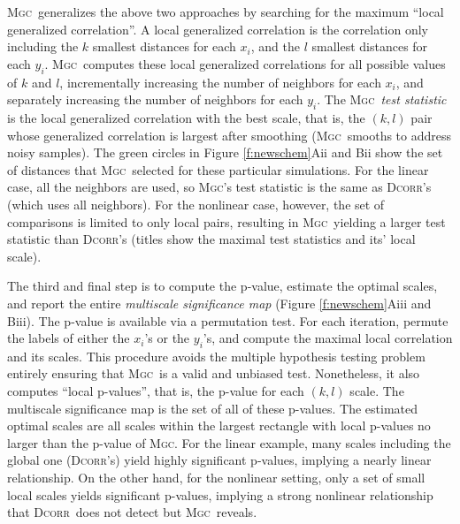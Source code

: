 \documentclass[11pt]{article}
\providecommand{\sct}[1]{{\normalfont\textsc{#1}}}
\newcommand{\Mgc}{\sct{Mgc}}
\newcommand{\Dcorr}{\sct{Dcorr}}
\begin{document}
\Mgc~generalizes the above two approaches by searching for the  maximum ``local generalized correlation''.
A local generalized correlation is the correlation only including the $k$ smallest distances for each $x_i$, and the $l$ smallest distances for each  $y_i$.  \Mgc~computes these local generalized correlations for all possible values of $k$ and $l$, incrementally increasing the number of neighbors for each $x_i$, and separately increasing the number of neighbors for each $y_i$.
The \Mgc~\emph{test statistic} is the local generalized correlation with the best scale, that is, the $(k,l)$ pair whose generalized correlation is largest after smoothing (\Mgc~smooths to address noisy samples). 
The green circles in Figure \ref{f:newschem}{\color{magenta}Aii} and {\color{magenta}Bii} show the set of distances that \Mgc~selected for these particular simulations.
For the linear case, all the neighbors are used, so  \Mgc's test statistic is the same as \Dcorr's (which uses all neighbors).  For the nonlinear case, however, the set of comparisons is limited to only local pairs, resulting in \Mgc~yielding a larger test statistic  than \Dcorr's (titles show the maximal test statistics and its' local scale).   

The third and final step is to compute the p-value, estimate the optimal scales, and report the entire \emph{multiscale significance map} (Figure \ref{f:newschem}{\color{magenta}Aiii} and {\color{magenta}Biii}). 
The p-value is available via a permutation test.  For each iteration, permute the labels of either the $x_i$'s or the $y_i$'s, and compute the maximal local correlation and its scales.  This procedure avoids the multiple hypothesis testing problem entirely ensuring that \Mgc~is a valid and unbiased test.  Nonetheless, it also computes ``local p-values'', that is, the p-value for each $(k,l)$ scale.  The multiscale significance map is the set of all of these p-values.   
The estimated optimal scales are all scales within the largest rectangle with local p-values no larger than the p-value of  \Mgc. For the linear example, many scales including the global one (\Dcorr's) yield highly significant p-values, implying a nearly linear relationship.
On the other hand, for the nonlinear setting, only a set of small local scales yields significant p-values, implying a strong nonlinear relationship that \Dcorr~does not detect but \Mgc~reveals.
\end{document}
